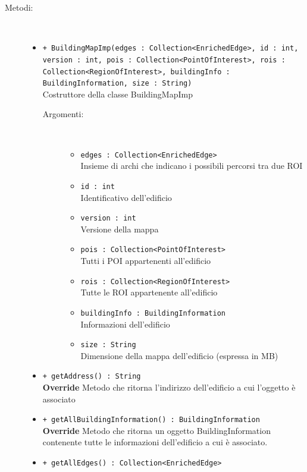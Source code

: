 \documentclass[../DefinizioneDiProdotto.tex]{subfiles}
\begin{document}
\begin{description}
\begin{itemize}
	\end{itemize}
	\item[Metodi:] \
	\begin{itemize}
		\item \texttt{+ BuildingMapImp(edges : Collection<EnrichedEdge>, id : int, version : int, pois : Collection<PointOfInterest>, rois : Collection<RegionOfInterest>, buildingInfo :\\ BuildingInformation, size : String)}\\
		Costruttore della classe BuildingMapImp
		\begin{description}
			\item[Argomenti:] \
			\begin{itemize}
				\item \texttt{edges : Collection<EnrichedEdge>}\\
				Insieme di archi che indicano i possibili percorsi tra due ROI\item \texttt{id : int}\\
				Identificativo dell'edificio\item \texttt{version : int}\\
				Versione della mappa\item \texttt{pois : Collection<PointOfInterest>}\\
				Tutti i POI appartenenti all'edificio\item \texttt{rois : Collection<RegionOfInterest>}\\
				Tutte le ROI appartenente all'edificio\item \texttt{buildingInfo : BuildingInformation}\\
				Informazioni dell'edificio\item \texttt{size : String}\\
				Dimensione della mappa dell'edificio (espressa in MB)\end{itemize}
		\end{description}
		\item \texttt{+ getAddress() : String}\\
		\textbf{Override} Metodo che ritorna l'indirizzo dell'edificio a cui l'oggetto è associato
		\item \texttt{+ getAllBuildingInformation() : BuildingInformation}\\
		\textbf{Override} Metodo che ritorna un oggetto BuildingInformation contenente tutte le informazioni dell'edificio a cui è associato.
		\item \texttt{+ getAllEdges() : Collection<EnrichedEdge>}\\

\end{itemize}
\end{description}
\end{document}
